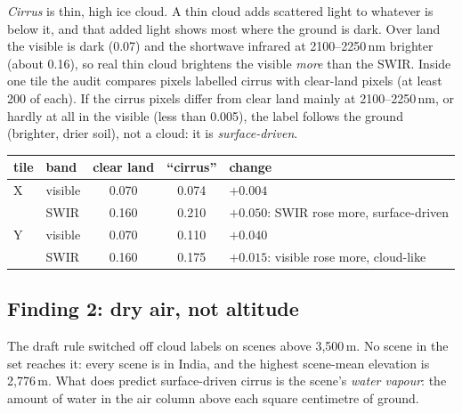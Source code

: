 \emph{Cirrus} is thin, high ice cloud. A thin cloud adds scattered light to whatever is below it, and that added light shows most where the ground is
dark. Over land the visible is dark (0.07) and the shortwave infrared at 2100--2250\,nm brighter (about 0.16), so real thin cloud brightens the visible
\emph{more} than the SWIR. Inside one tile the audit compares pixels labelled cirrus with clear-land pixels (at least 200 of each). If the cirrus pixels
differ from clear land mainly at 2100--2250\,nm, or hardly at all in the visible (less than 0.005), the label follows the ground (brighter, drier soil),
not a cloud: it is \emph{surface-driven}.
\begin{center}
\begin{tabular}{llccl}
\toprule
tile & band & clear land & ``cirrus'' & change\\
\midrule
X & visible & 0.070 & 0.074 & $+0.004$\\
  & SWIR & 0.160 & 0.210 & $+0.050$: SWIR rose more, surface-driven\\
Y & visible & 0.070 & 0.110 & $+0.040$\\
  & SWIR & 0.160 & 0.175 & $+0.015$: visible rose more, cloud-like\\
\bottomrule
\end{tabular}
\end{center}

\subsection{Finding 2: dry air, not altitude}

The draft rule switched off cloud labels on scenes above 3,500\,m. No scene in the set reaches it: every scene is in India, and the highest scene-mean
elevation is 2,776\,m. What does predict surface-driven cirrus is the scene's \emph{water vapour}: the amount of water in the air
column above each square centimetre of ground.

